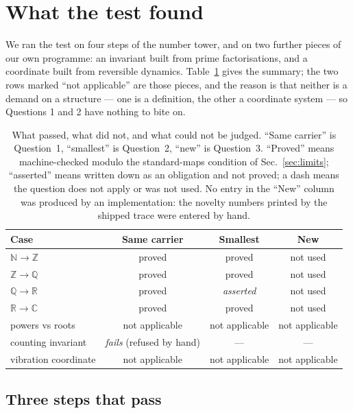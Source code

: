 \documentclass[aps,prd,preprint,superscriptaddress,amsmath,amssymb]{revtex4-2}
\begin{document}
\section{What the test found}
\label{sec:found}

We ran the test on four steps of the number tower, and on two further pieces of
our own programme: an invariant built from prime factorisations, and a coordinate
built from reversible dynamics.  Table~\ref{tab:results} gives the summary; the
two rows marked ``not applicable'' are those pieces, and the reason is that
neither is a demand on a structure --- one is a definition, the other a coordinate
system --- so Questions 1 and 2 have nothing to bite on.

\begin{table}[t]
\caption{What passed, what did not, and what could not be judged.  ``Same
carrier'' is Question~1, ``smallest'' is Question~2, ``new'' is Question~3.
``Proved'' means machine-checked modulo the standard-maps condition of
Sec.~\ref{sec:limits}; ``asserted'' means written down as an obligation and not
proved; a dash means the question does not apply or was not used.  No entry in the
``New'' column was produced by an implementation: the novelty numbers printed by
the shipped trace were entered by hand.}
\label{tab:results}
\begin{ruledtabular}
\begin{tabular}{lccc}
Case & Same carrier & Smallest & New \\
\hline
$\mathbb{N}\to\mathbb{Z}$ & proved & proved & not used \\
$\mathbb{Z}\to\mathbb{Q}$ & proved & proved & not used \\
$\mathbb{Q}\to\mathbb{R}$ & proved & \emph{asserted} & not used \\
$\mathbb{R}\to\mathbb{C}$ & proved & proved & not used \\
powers vs roots & not applicable & not applicable & not applicable \\
counting invariant & \emph{fails} (refused by hand) & --- & --- \\
vibration coordinate & not applicable & not applicable & not applicable \\
\end{tabular}
\end{ruledtabular}
\end{table}

\subsection{Three steps that pass}
\label{sec:tower}
\end{document}
